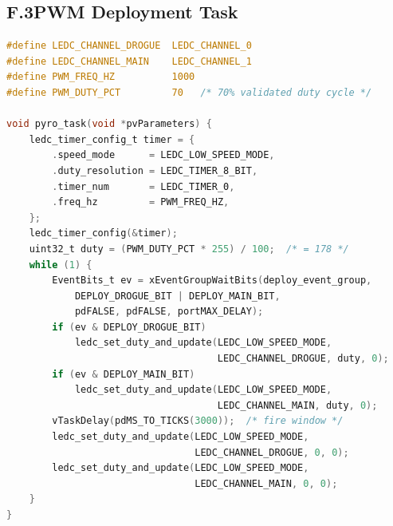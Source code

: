 \subsection*{F.3\quad PWM Deployment Task}
\begin{lstlisting}[language=C, caption={IRLZ44N MOSFET PWM deployment channel control (excerpt from \texttt{pyro\_task.c}) \cite{n4_github}}]
#define LEDC_CHANNEL_DROGUE  LEDC_CHANNEL_0
#define LEDC_CHANNEL_MAIN    LEDC_CHANNEL_1
#define PWM_FREQ_HZ          1000
#define PWM_DUTY_PCT         70   /* 70% validated duty cycle */

void pyro_task(void *pvParameters) {
    ledc_timer_config_t timer = {
        .speed_mode      = LEDC_LOW_SPEED_MODE,
        .duty_resolution = LEDC_TIMER_8_BIT,
        .timer_num       = LEDC_TIMER_0,
        .freq_hz         = PWM_FREQ_HZ,
    };
    ledc_timer_config(&timer);
    uint32_t duty = (PWM_DUTY_PCT * 255) / 100;  /* = 178 */
    while (1) {
        EventBits_t ev = xEventGroupWaitBits(deploy_event_group,
            DEPLOY_DROGUE_BIT | DEPLOY_MAIN_BIT,
            pdFALSE, pdFALSE, portMAX_DELAY);
        if (ev & DEPLOY_DROGUE_BIT)
            ledc_set_duty_and_update(LEDC_LOW_SPEED_MODE,
                                     LEDC_CHANNEL_DROGUE, duty, 0);
        if (ev & DEPLOY_MAIN_BIT)
            ledc_set_duty_and_update(LEDC_LOW_SPEED_MODE,
                                     LEDC_CHANNEL_MAIN, duty, 0);
        vTaskDelay(pdMS_TO_TICKS(3000));  /* fire window */
        ledc_set_duty_and_update(LEDC_LOW_SPEED_MODE,
                                 LEDC_CHANNEL_DROGUE, 0, 0);
        ledc_set_duty_and_update(LEDC_LOW_SPEED_MODE,
                                 LEDC_CHANNEL_MAIN, 0, 0);
    }
}
\end{lstlisting}


